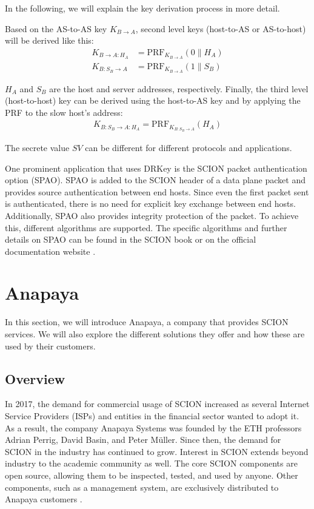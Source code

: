 In the following, we will explain the key derivation process in more detail.

Based on the AS-to-AS key $K_{B \rightarrow A}$, second level keys (host-to-AS or AS-to-host) will be derived like this:
\begin{align*}
K_{B \rightarrow A:H_A} &= \text{PRF}_{K_{B \rightarrow A}}(0 \parallel H_A) \\
K_{B:S_B \rightarrow A} &= \text{PRF}_{K_{B \rightarrow A}}(1 \parallel S_B)
\end{align*}

$H_A$ and $S_B$ are the host and server addresses, respectively.
Finally, the third level (host-to-host) key can be derived using the host-to-AS key and by applying the PRF to the slow host's address:
\begin{align*}
    K_{B:S_B \rightarrow A:H_A} = \text{PRF}_{K_{B:S_B \rightarrow A}}(H_A)
\end{align*}

The secrete value $SV$ can be different for different protocols and applications.

\label{sec:spao}
One prominent application that uses DRKey is the SCION packet authentication option (SPAO).
SPAO is added to the SCION header of a data plane packet and provides source authentication between end hosts.
Since even the first packet sent is authenticated, there is no need for explicit key exchange between end hosts.
Additionally, SPAO also provides integrity protection of the packet.
To achieve this, different algorithms are supported.
The specific algorithms and further details on SPAO can be found in the SCION book or on the official documentation website \cite{anapayaSCIONPacket}.


\section{Anapaya}
\label{sec:anapaya}
In this section, we will introduce Anapaya, a company that provides SCION services.
We will also explore the different solutions they offer and how these are used by their customers.

\subsection{Overview}
In 2017, the demand for commercial usage of SCION increased as several Internet Service Providers (ISPs) and entities in the financial sector wanted to adopt it.
As a result, the company Anapaya Systems was founded by the ETH professors Adrian Perrig, David Basin, and Peter Müller.
Since then, the demand for SCION in the industry has continued to grow.
Interest in SCION extends beyond industry to the academic community as well.
The core SCION components are open source, allowing them to be inspected, tested, and used by anyone.
Other components, such as a management system, are exclusively distributed to Anapaya customers \cite{ethzSecureInternet}.



